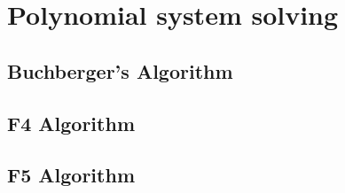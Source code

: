 \chapter{Polynomial system solving}

\section{Buchberger's Algorithm}

\section{F4 Algorithm}

\section{F5 Algorithm}
